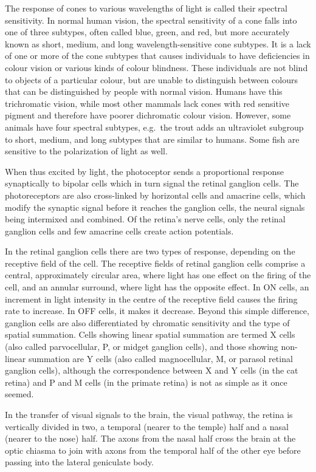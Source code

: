 \documentclass[]{book}
\begin{document}
The response of cones to various wavelengths of light is called their spectral sensitivity. In normal human vision, the spectral sensitivity of a cone falls into one of three subtypes, often called blue, green, and red, but more accurately known as short, medium, and long wavelength-sensitive cone subtypes. It is a lack of one or more of the cone subtypes that causes individuals to have deficiencies in colour vision or various kinds of colour blindness. These individuals are not blind to objects of a particular colour, but are unable to distinguish between colours that can be distinguished by people with normal vision. Humans have this trichromatic vision, while most other mammals lack cones with red sensitive pigment and therefore have poorer dichromatic colour vision. However, some animals have four spectral subtypes, e.g.~the trout adds an ultraviolet subgroup to short, medium, and long subtypes that are similar to humans. Some fish are sensitive to the polarization of light as well.

When thus excited by light, the photoceptor sends a proportional response synaptically to bipolar cells which in turn signal the retinal ganglion cells. The photoreceptors are also cross-linked by horizontal cells and amacrine cells, which modify the synaptic signal before it reaches the ganglion cells, the neural signals being intermixed and combined. Of the retina's nerve cells, only the retinal ganglion cells and few amacrine cells create action potentials.

In the retinal ganglion cells there are two types of response, depending on the receptive field of the cell. The receptive fields of retinal ganglion cells comprise a central, approximately circular area, where light has one effect on the firing of the cell, and an annular surround, where light has the opposite effect. In ON cells, an increment in light intensity in the centre of the receptive field causes the firing rate to increase. In OFF cells, it makes it decrease. Beyond this simple difference, ganglion cells are also differentiated by chromatic sensitivity and the type of spatial summation. Cells showing linear spatial summation are termed X cells (also called parvocellular, P, or midget ganglion cells), and those showing non-linear summation are Y cells (also called magnocellular, M, or parasol retinal ganglion cells), although the correspondence between X and Y cells (in the cat retina) and P and M cells (in the primate retina) is not as simple as it once seemed.

In the transfer of visual signals to the brain, the visual pathway, the retina is vertically divided in two, a temporal (nearer to the temple) half and a nasal (nearer to the nose) half. The axons from the nasal half cross the brain at the optic chiasma to join with axons from the temporal half of the other eye before passing into the lateral geniculate body.
\end{document}

